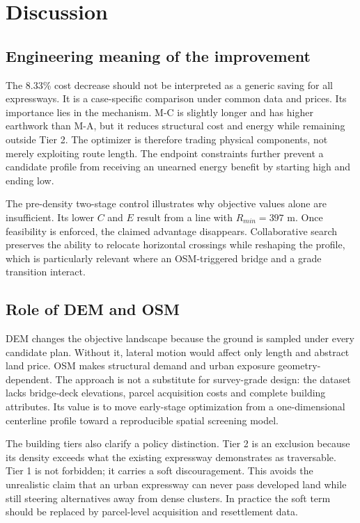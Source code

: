 \documentclass[preprint,12pt]{elsarticle}
\begin{document}
\section{Discussion}

\subsection{Engineering meaning of the improvement}

The 8.33\% cost decrease should not be interpreted as a generic saving for all expressways. It is a case-specific comparison under common data and prices. Its importance lies in the mechanism. M-C is slightly longer and has higher earthwork than M-A, but it reduces structural cost and energy while remaining outside Tier 2. The optimizer is therefore trading physical components, not merely exploiting route length. The endpoint constraints further prevent a candidate profile from receiving an unearned energy benefit by starting high and ending low.

The pre-density two-stage control illustrates why objective values alone are insufficient. Its lower $C$ and $E$ result from a line with $R_{min}=397$ m. Once feasibility is enforced, the claimed advantage disappears. Collaborative search preserves the ability to relocate horizontal crossings while reshaping the profile, which is particularly relevant where an OSM-triggered bridge and a grade transition interact.

\subsection{Role of DEM and OSM}

DEM changes the objective landscape because the ground is sampled under every candidate plan. Without it, lateral motion would affect only length and abstract land price. OSM makes structural demand and urban exposure geometry-dependent. The approach is not a substitute for survey-grade design: the dataset lacks bridge-deck elevations, parcel acquisition costs and complete building attributes. Its value is to move early-stage optimization from a one-dimensional centerline profile toward a reproducible spatial screening model.

The building tiers also clarify a policy distinction. Tier 2 is an exclusion because its density exceeds what the existing expressway demonstrates as traversable. Tier 1 is not forbidden; it carries a soft discouragement. This avoids the unrealistic claim that an urban expressway can never pass developed land while still steering alternatives away from dense clusters. In practice the soft term should be replaced by parcel-level acquisition and resettlement data.
\end{document}
